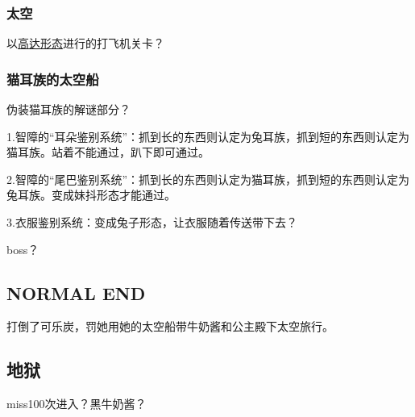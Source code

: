 \documentclass{article}
\begin{document}
\subsubsection{太空}

以\hyperref[costume_gundam]{高达形态}进行的打飞机关卡？

\subsubsection{猫耳族的太空船}

伪装猫耳族的解谜部分？

1.智障的“耳朵鉴别系统”：抓到长的东西则认定为兔耳族，抓到短的东西则认定为猫耳族。站着不能通过，趴下即可通过。

2.智障的“尾巴鉴别系统”：抓到长的东西则认定为猫耳族，抓到短的东西则认定为兔耳族。变成妹抖形态才能通过。

3.衣服鉴别系统：变成兔子形态，让衣服随着传送带下去？

boss？

\subsection{NORMAL END}

打倒了可乐炭，罚她用她的太空船带牛奶酱和公主殿下太空旅行。

\subsection{地狱}

miss100次进入？黑牛奶酱？
\end{document}

